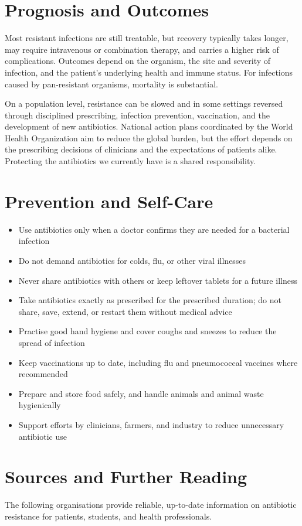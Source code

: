\section*{Prognosis and Outcomes}
Most resistant infections are still treatable, but recovery typically takes longer, may require intravenous or combination therapy, and carries a higher risk of complications. Outcomes depend on the organism, the site and severity of infection, and the patient's underlying health and immune status. For infections caused by pan-resistant organisms, mortality is substantial.

On a population level, resistance can be slowed and in some settings reversed through disciplined prescribing, infection prevention, vaccination, and the development of new antibiotics. National action plans coordinated by the World Health Organization aim to reduce the global burden, but the effort depends on the prescribing decisions of clinicians and the expectations of patients alike. Protecting the antibiotics we currently have is a shared responsibility.

\section*{Prevention and Self-Care}
\begin{itemize}
    \item Use antibiotics only when a doctor confirms they are needed for a bacterial infection
    \item Do not demand antibiotics for colds, flu, or other viral illnesses
    \item Never share antibiotics with others or keep leftover tablets for a future illness
    \item Take antibiotics exactly as prescribed for the prescribed duration; do not share, save, extend, or restart them without medical advice
    \item Practise good hand hygiene and cover coughs and sneezes to reduce the spread of infection
    \item Keep vaccinations up to date, including flu and pneumococcal vaccines where recommended
    \item Prepare and store food safely, and handle animals and animal waste hygienically
    \item Support efforts by clinicians, farmers, and industry to reduce unnecessary antibiotic use
\end{itemize}

\section*{Sources and Further Reading}
The following organisations provide reliable, up-to-date information on antibiotic resistance for patients, students, and health professionals.


